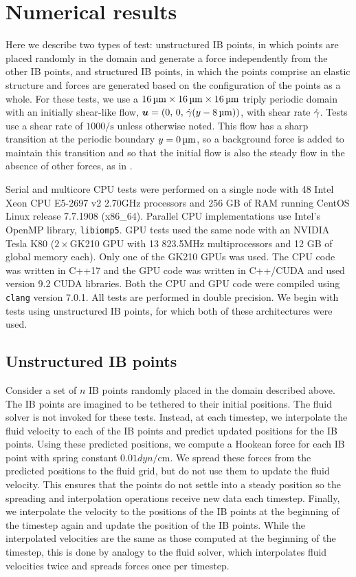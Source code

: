 \section{Numerical results}

Here we describe two types of test: unstructured IB points, in which points are placed
randomly in the domain and generate a force independently from the other IB points, and
structured IB points, in which the points comprise an elastic structure and forces are
generated based on the configuration of the points as a whole. For these tests, we use
a $16\um\times16\um\times16\um$ triply periodic domain with an initially shear-like flow,
$\u=(0,\,0,\,\shear(y-8\um))$, with shear rate $\dot{\gamma}$. Tests use a shear rate of
$1000\si{\per\second}$ unless otherwise noted. This flow has a sharp transition at the
periodic boundary $y=0\um$, so a background force is added to maintain this transition
and so that the initial flow is also the steady flow in the absence of other forces, as
in \cite{Fai:2013do}.

Serial and multicore CPU tests were performed on a single node with 48 Intel{\reg}
Xeon{\reg} CPU E5-2697 v2 2.70\si{\giga\hertz} processors and 256 GB of RAM running
CentOS Linux release 7.7.1908 (x86\_64). Parallel CPU implementations use Intel's OpenMP
library, \texttt{libiomp5}. GPU tests used the same node with an NVIDIA{\reg} Tesla{\reg}
K80 ($2\times$GK210 GPU with 13 823.5\si{\mega\hertz} multiprocessors and 12 GB of global
memory each). Only one of the GK210 GPUs was used. The CPU code was written in C++17 and
the GPU code was written in C++/CUDA and used version 9.2 CUDA libraries. Both the CPU
and GPU code were compiled using \texttt{clang} version 7.0.1. All tests are performed in
double precision. We begin with tests using unstructured IB points, for which both of
these architectures were used.

\subsection{Unstructured IB points}\label{sec:unst}

Consider a set of $n$ IB points randomly placed in the domain described above. The IB
points are imagined to be tethered to their initial positions. The fluid solver is not
invoked for these tests. Instead, at each timestep, we interpolate the fluid velocity to
each of the IB points and predict updated positions for the IB points. Using these
predicted positions, we compute a Hookean force for each IB point with spring constant
$0.01\si{dyn\per\centi\meter}$. We spread these forces from the predicted positions to
the fluid grid, but do not use them to update the fluid velocity. This ensures that the
points do not settle into a steady position so the spreading and interpolation operations
receive new data each timestep. Finally, we interpolate the velocity to the positions of
the IB points at the beginning of the timestep again and update the position of the IB
points. While the interpolated velocities are the same as those computed at the beginning
of the timestep, this is done by analogy to the fluid solver, which interpolates fluid
velocities twice and spreads forces once per timestep.

